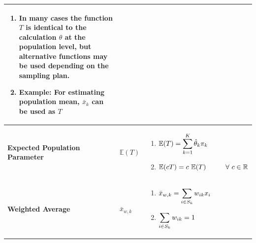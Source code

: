 \begin{customArrayStretch}{1.3}
\begin{longtable}{>{\RaggedRight\arraybackslash}p{4cm} >{\centering\arraybackslash}p{0.5cm} p{10.5cm}}
\begin{minipage}{10.3cm}
\begin{enumerate}
            \item In many cases the function $T$ is identical to the calculation $\theta$ at the population level, but alternative functions may be used depending on the sampling plan.
            \hfill \cite{statistics/book/Statistics-for-Data-Scientists/Maurits-Kaptein}

            \item \textbf{Example}: For estimating population mean, $\bar{x}_k$ can be used as $T$
            \hfill \cite{statistics/book/Statistics-for-Data-Scientists/Maurits-Kaptein}
        \end{enumerate}
        \vspace{0.15cm}
    \end{minipage}
    \\ \hline

\textbf{Expected Population Parameter} &
    $\mathbb{E}(T)$ &
    \begin{minipage}{10.3cm}
        \vspace{0.15cm}
        \begin{enumerate}
            \item $
                \mathbb{E}(T)
                = \displaystyle\sum_{k=1}^{K} \hat{\theta}_k \pi_k
            $
            \hfill \cite{statistics/book/Statistics-for-Data-Scientists/Maurits-Kaptein}

            \item $
                \mathbb{E}(cT) = c\ \mathbb{E}(T)
                \hspace{1cm} \forall\  c \in \mathbb{R}
            $
            \hfill \cite{statistics/book/Statistics-for-Data-Scientists/Maurits-Kaptein}

        \end{enumerate}
        \vspace{0.15cm}
    \end{minipage}
    \\ \hline


\textbf{Weighted Average} &
    $\bar{x}_{w,k}$ &
    \begin{minipage}{10.3cm}
        \vspace{0.15cm}
        \begin{enumerate}
            \item $
                \bar{x}_{w,k}
                = \displaystyle\sum_{i \in S_k} w_{ik}x_i
            $
            \hfill \cite{statistics/book/Statistics-for-Data-Scientists/Maurits-Kaptein}

            \item $
                \displaystyle\sum_{i \in S_k} w_{ik} = 1
            $
            \hfill \cite{statistics/book/Statistics-for-Data-Scientists/Maurits-Kaptein}


\end{enumerate}
\end{minipage}
\end{longtable}
\end{customArrayStretch}
